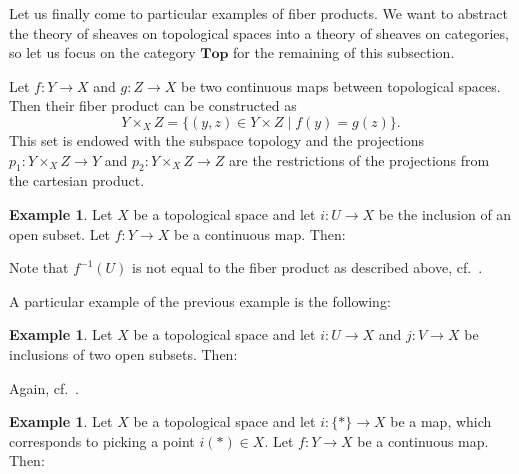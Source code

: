 \documentclass[12pt,a4paper]{amsart}
\theoremstyle{plain}
\theoremstyle{definition}
\newtheorem{exmp}[thm]{Example}
\theoremstyle{remark}
\begin{document}
Let us finally come to particular examples of fiber products.
We want to abstract the theory of sheaves on topological spaces into a theory of sheaves on categories, so let us focus on the category $\mathbf{Top}$ for the remaining of this subsection.

Let $f \colon Y \to X$ and $g \colon Z \to X$ be two continuous maps between topological spaces.
Then their fiber product can be constructed as
\[ Y \times_{X} Z = \{ (y,z) \in Y \times Z \mid f(y) = g(z) \}. \]
This set is endowed with the subspace topology and the projections $p_{1} \colon Y \times_{X} Z \to Y$ and $p_{2} \colon Y \times_{X} Z \to Z$ are the restrictions of the projections from the cartesian product.

\begin{exmp}\label{exmp:preimage}
  Let $X$ be a topological space and let $i \colon U \to X$ be the inclusion of an open subset.
  Let $f \colon Y \to X$ be a continuous map.
  Then:
  \begin{center}
  \end{center}
  Note that $f^{-1}(U)$ is not equal to the fiber product as described above, cf.~.
\end{exmp}

A particular example of the previous example is the following:

\begin{exmp}
  Let $X$ be a topological space and let $i \colon U \to X$ and $j \colon V \to X$ be inclusions of two open subsets.
  Then:
  \begin{center}
  \end{center}
  Again, cf.~.
\end{exmp}

\begin{exmp}\label{exmp:fiber}
  Let $X$ be a topological space and let $i \colon \{ * \} \to X$ be a map, which corresponds to picking a point $i(*) \in X$.
  Let $f \colon Y \to X$ be a continuous map.
  Then:
  \begin{center}
  \end{center}
\end{exmp}
\end{document}

